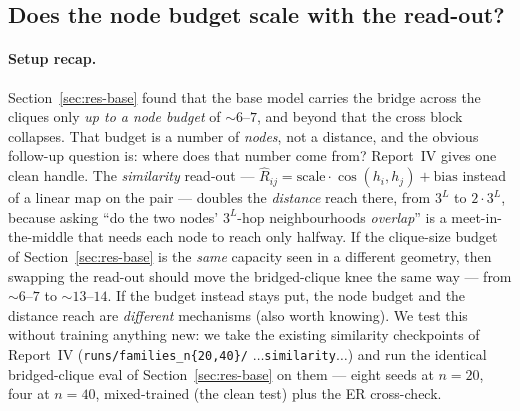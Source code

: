 \documentclass[11pt,a4paper]{article}
\begin{document}
\subsection{Does the node budget scale with the read-out?}
\label{sec:res-sim}
\paragraph{Setup recap.} Section~\ref{sec:res-base} found that the base model carries the
bridge across the cliques only \emph{up to a node budget} of $\sim6$--$7$, and beyond that the
cross block collapses. That budget is a number of \emph{nodes}, not a distance, and the obvious
follow-up question is: where does that number come from? Report~IV gives one clean handle. The
\emph{similarity} read-out --- $\hat R_{ij}=\mathrm{scale}\cdot\cos(h_i,h_j)+\mathrm{bias}$
instead of a linear map on the pair --- doubles the \emph{distance} reach there, from $3^L$ to
$2\cdot3^L$, because asking ``do the two nodes' $3^L$-hop neighbourhoods \emph{overlap}'' is a
meet-in-the-middle that needs each node to reach only halfway. If the clique-size budget of
Section~\ref{sec:res-base} is the \emph{same} capacity seen in a different geometry, then swapping
the read-out should move the bridged-clique knee the same way --- from $\sim6$--$7$ to
$\sim13$--$14$. If the budget instead stays put, the node budget and the distance reach are
\emph{different} mechanisms (also worth knowing). We test this without training anything new: we
take the existing similarity checkpoints of Report~IV (\texttt{runs/families\_n\{20,40\}/}
$\ldots$\texttt{similarity}$\ldots$) and run the identical bridged-clique eval of
Section~\ref{sec:res-base} on them --- eight seeds at $n=20$, four at $n=40$, mixed-trained (the
clean test) plus the ER cross-check.
\end{document}
